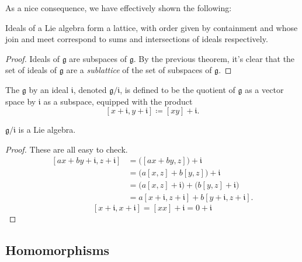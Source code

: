 \documentclass{article}
\newcommand{\lb}[1]{\ensuremath{\left[{#1}\right]}}
\newcommand*\frkg{{\ensuremath{\mathfrak{g}}}}
\newcommand*\frki{{\ensuremath{\mathfrak{i}}}}
\begin{document}
As a nice consequence, we have effectively shown the following:

\begin{proposition}
    \label{thm:IdealLattice}
    Ideals of a Lie algebra form a lattice, with order given by containment and whose join and meet correspond to sums and intersections of ideals respectively.
\end{proposition}

\begin{proof}
    Ideals of $\frkg$ are subspaces of $\frkg$.
    By the previous theorem, it's clear that the set of ideals of $\frkg$ are a \textit{sublattice} of the set of subspaces of $\frkg$.
\end{proof}

\begin{definition}
    The  $\frkg$ by an ideal $\frki$, denoted $\frkg/\frki$, is defined to be the quotient of $\frkg$ as a vector space by $\frki$ as a subspace, equipped with the product
    \[
        \lb{x+\frki,y+\frki}
        \coloneq
        \lb{xy} + \frki.
    \]
\end{definition}

\begin{proposition}
    $\frkg/\frki$ is a Lie algebra.
\end{proposition}
\begin{proof}
    These are all easy to check.
    \begin{align*}
        \lb{ax+by+\frki,z+\frki}
        &=
        \Big(\lb{ax+by,z}\Big) + \frki
        \\\
        &=
        \Big(
            a\lb{x,z}  
            +
            b\lb{y,z}  
        \Big)
        + \frki
        \\
        &=
        \Big(
            a\lb{x,z} + \frki
        \Big)
        +
        \Big(
            b\lb{y,z} + \frki 
        \Big)
        \\
        &=
        a\lb{x+\frki,z+\frki} + b\lb{y+\frki,z+\frki}.
    \end{align*}
    \[
        \lb{x+\frki,x+\frki}
        =
        \lb{xx} + \frki
        =
        0 + \frki
    \]
\end{proof}

\newcommand{\barphi}{\ensuremath{\overline{\phi}}}

\subsection{Homomorphisms}
\end{document}
